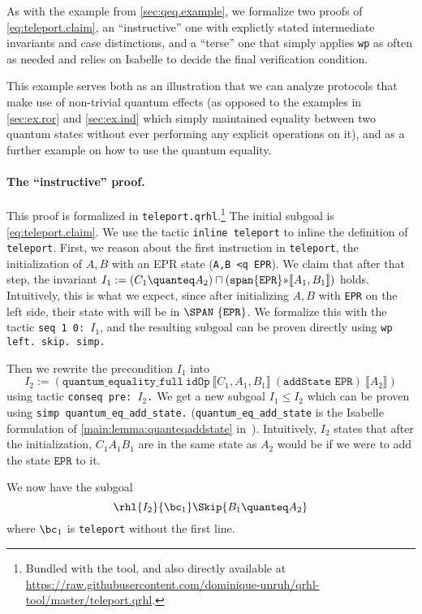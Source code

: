 \documentclass{article}
\newcommand\giturl[1]{\url{https://raw.githubusercontent.com/dominique-unruh/qrhl-tool/master/#1}}
\newcommand\qrhlautoref[1]{\autoref*{main:#1} in~\cite{qrhl-paper-from-manual}}
\begin{document}
As with the example from \autoref{sec:qeq.example}, we formalize two
proofs of \eqref{eq:teleport.claim}, an ``instructive'' one with
explictly stated intermediate invariants and case distinctions, and a
``terse'' one that simply applies \texttt{wp} as often as needed and
relies on Isabelle to decide the final verification condition.

This example serves both as an illustration that we can analyze
protocols that make use of non-trivial quantum effects (as opposed to
the examples in \autoref{sec:ex.ror} and \autoref{sec:ex.ind} which
simply maintained equality between two quantum states without ever
performing any explicit operations on it), and as a further example on
how to use the quantum equality.

\paragraph{The ``instructive'' proof.} This proof is formalized in \texttt{teleport.qrhl}.\footnote{Bundled with the tool, and also directly available at \giturl{teleport.qrhl}.}
The initial subgoal is \eqref{eq:teleport.claim}. We use the tactic
\texttt{inline teleport} to inline the definition of
\texttt{teleport}. First, we reason about the first instruction in
\texttt{teleport}, the initialization of $A,B$
with an EPR state (\texttt{A,B <q EPR}). We claim that after that
step, the invariant
$I_1:={(C_1\quanteq A_2) \sqcap (\mathtt{span}
\{\mathtt{EPR}\}\text\guillemotright\llbracket A_1,B_1\rrbracket)}$
holds. Intuitively, this is what we expect, since after initializing
$A,B$
with \texttt{EPR} on the left side, their state with will be in
$\SPAN\ \{\mathtt{EPR}\}$.
We formalize this with the tactic \texttt{seq 1 0: $I_1$},
and the resulting subgoal can be proven directly using
\texttt{\frenchspacing wp left. skip. simp.}

Then we rewrite the precondition $I_1$
into
\[
  I_2:=(\mathtt{quantum\_equality\_full}\ \mathtt{idOp}\ ⟦C_1,A_1,B_1⟧\
  (\texttt{addState EPR})\ ⟦A_2⟧)
\] using tactic \texttt{\frenchspacing conseq pre: $I_2$.}
We get a new subgoal $I_1\leq I_2$
which can be proven using \texttt{simp quantum\_eq\_add\_state.}
(\texttt{quantum\_eq\_add\_state} is the Isabelle formulation of
\qrhlautoref{lemma:quanteqaddstate}). Intuitively, $I_2$
states that after the initialization, $C_1A_1B_1$
are in the same state as $A_2$
would be if we were to add the state $\mathtt{EPR}$ to it.


We now have the subgoal
\[
\rhl{I_2}{\bc_1}\Skip{B_1\quanteq A_2}
\]
where $\bc_1$ is \texttt{teleport} without the first line.
\end{document}
